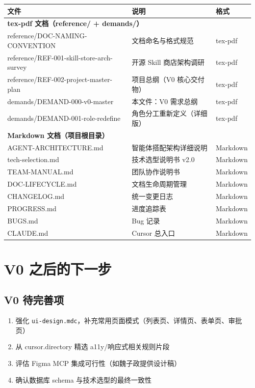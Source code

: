 \documentclass[11pt,a4paper]{article}
\begin{document}
\begin{table}[h]
\centering
\small
\begin{tabular}{p{5.5cm}p{6cm}p{1.8cm}}
\toprule
\textbf{文件} & \textbf{说明} & \textbf{格式} \\
\midrule
\multicolumn{3}{l}{\textbf{tex-pdf 文档（reference/ + demands/）}} \\
\midrule
reference/DOC-NAMING-CONVENTION & 文档命名与格式规范 & tex-pdf \\
reference/REF-001-skill-store-arch-survey & 开源 Skill 商店架构调研 & tex-pdf \\
reference/REF-002-project-master-plan & 项目总纲（V0 核心交付物） & tex-pdf \\
demands/DEMAND-000-v0-master & 本文件：V0 需求总纲 & tex-pdf \\
demands/DEMAND-001-role-redefine & 角色分工重新定义（详细版） & tex-pdf \\
\midrule
\multicolumn{3}{l}{\textbf{Markdown 文档（项目根目录）}} \\
\midrule
AGENT-ARCHITECTURE.md & 智能体搭配架构详细说明 & Markdown \\
tech-selection.md & 技术选型说明书 v2.0 & Markdown \\
TEAM-MANUAL.md & 团队协作说明书 & Markdown \\
DOC-LIFECYCLE.md & 文档生命周期管理 & Markdown \\
CHANGELOG.md & 统一变更日志 & Markdown \\
PROGRESS.md & 进度追踪表 & Markdown \\
BUGS.md & Bug 记录 & Markdown \\
CLAUDE.md & Cursor 总入口 & Markdown \\
\bottomrule
\end{tabular}
\end{table}

\section{V0 之后的下一步}

\subsection{V0 待完善项}

\begin{enumerate}[nosep]
  \item 强化 \texttt{ui-design.mdc}，补充常用页面模式（列表页、详情页、表单页、审批页）
  \item 从 cursor.directory 精选 a11y/响应式相关规则片段
  \item 评估 Figma MCP 集成可行性（如魏子政提供设计稿）
  \item 确认数据库 schema 与技术选型的最终一致性
\end{enumerate}
\end{document}
